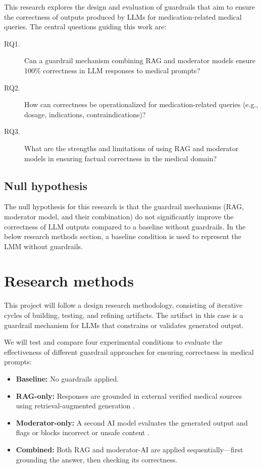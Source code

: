 \documentclass[a4paper,doc,natbib]{apa6}
\begin{document}
    This research explores the design and evaluation of guardrails that aim to ensure the correctness of outputs produced by LLMs for medication-related medical queries. The central questions guiding this work are:

    \begin{description}
        \item[RQ1.] Can a guardrail mechanism combining RAG and moderator models ensure 100\% correctness in LLM responses to medical prompts?
        \item[RQ2.] How can correctness be operationalized for medication-related queries (e.g., dosage, indications, contraindications)?
        \item[RQ3.] What are the strengths and limitations of using RAG and moderator models in ensuring factual correctness in the medical domain?
    \end{description}

    \subsection{Null hypothesis}
    The null hypothesis for this research is that the guardrail mechanisms (RAG, moderator model, and their combination)
    do not significantly improve the correctness of LLM outputs compared to a baseline without guardrails.
    In the below research methods section, a baseline condition is used to represent the LMM without guardrails.

    \section{Research methods}

    This project will follow a design research methodology, consisting of iterative cycles of building, testing, and refining artifacts. The artifact in this case is a guardrail mechanism for LLMs that constrains or validates generated output.

    We will test and compare four experimental conditions to evaluate the effectiveness of different guardrail approaches for ensuring correctness in medical prompts:

    \begin{itemize}
        \item \textbf{Baseline:} No guardrails applied.
        \item \textbf{RAG-only:} Responses are grounded in external verified medical sources using retrieval-augmented generation \citep{dong2024guardrails}.
        \item \textbf{Moderator-only:} A second AI model evaluates the generated output and flags or blocks incorrect or unsafe content \citep{inan2023llamaguard}.
        \item \textbf{Combined:} Both RAG and moderator-AI are applied sequentially—first grounding the answer, then checking its correctness.
    \end{itemize}
\end{document}
